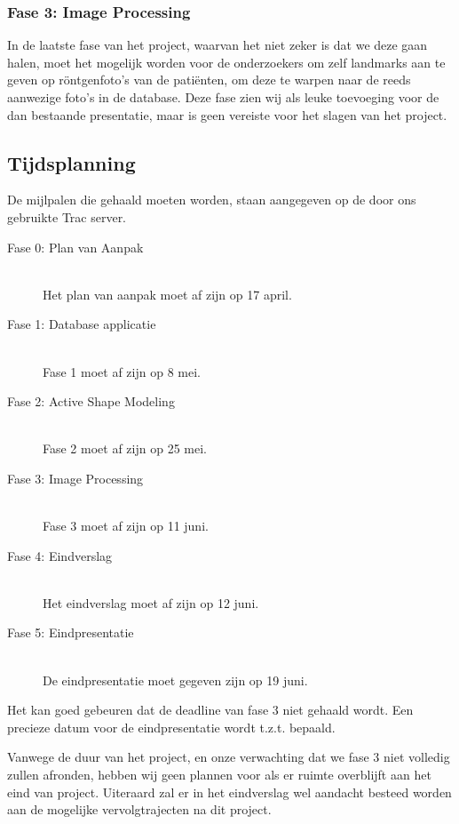 \subsubsection{Fase 3: Image Processing}
In de laatste fase van het project, waarvan het niet zeker is dat we deze gaan halen, moet het mogelijk worden voor de onderzoekers om zelf landmarks aan te geven op r\"ontgenfoto's van de pati\"enten, om deze te warpen naar de reeds aanwezige foto's in de database. Deze fase zien wij als leuke toevoeging voor de dan bestaande presentatie, maar is geen vereiste voor het slagen van het project.

\subsection{Tijdsplanning}




De mijlpalen die gehaald moeten worden, staan aangegeven op de door ons gebruikte Trac server.
\begin{description}
	\item[Fase 0: Plan van Aanpak]\hspace*{\fill} \\
Het plan van aanpak moet af zijn op 17 april.

	\item[Fase 1: Database applicatie]\hspace*{\fill} \\
Fase 1 moet af zijn op 8 mei.

	\item[Fase 2: Active Shape Modeling]\hspace*{\fill} \\
Fase 2 moet af zijn op 25 mei.

	\item[Fase 3: Image Processing]\hspace*{\fill} \\
Fase 3 moet af zijn op 11 juni.

	\item[Fase 4: Eindverslag]\hspace*{\fill} \\
Het eindverslag moet af zijn op 12 juni.

	\item[Fase 5: Eindpresentatie]\hspace*{\fill} \\
De eindpresentatie moet gegeven zijn op 19 juni.

\end{description}
Het kan goed gebeuren dat de deadline van fase 3 niet gehaald wordt.
Een precieze datum voor de eindpresentatie wordt t.z.t. bepaald.

Vanwege de duur van het project, en onze verwachting dat we fase 3 niet volledig zullen afronden, hebben wij geen plannen voor als er ruimte overblijft aan het eind van project. 
Uiteraard zal er in het eindverslag wel aandacht besteed worden aan de mogelijke vervolgtrajecten na dit project.
